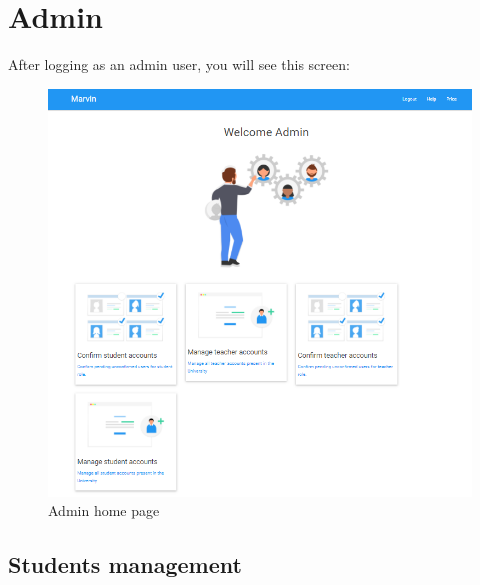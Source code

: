 \documentclass[ManualeUtente]{subfiles}
\begin{document}
	
	\chapter{Admin}
	After logging as an admin user, you will see this screen:
	\begin{figure}[H]
		\centering
		\includegraphics[width=1\linewidth]{image/Admin}
		\caption[Admin home page]{Admin home page}
		\label{fig:universityaddamin}
	\end{figure}
	
	\section{Students management}
\end{document}
